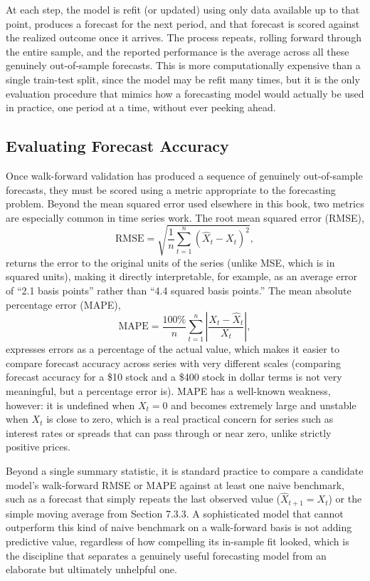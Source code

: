 \documentclass[../ai_in_finance]{subfiles}
\begin{document}
At each step, the model is refit (or updated) using only data available up to that point, produces a forecast for the next period, and that forecast is scored against the realized outcome once it arrives. The process repeats, rolling forward through the entire sample, and the reported performance is the average across all these genuinely out-of-sample forecasts. This is more computationally expensive than a single train-test split, since the model may be refit many times, but it is the only evaluation procedure that mimics how a forecasting model would actually be used in practice, one period at a time, without ever peeking ahead.

\subsection{Evaluating Forecast Accuracy}

Once walk-forward validation has produced a sequence of genuinely out-of-sample forecasts, they must be scored using a metric appropriate to the forecasting problem. Beyond the mean squared error used elsewhere in this book, two metrics are especially common in time series work. The root mean squared error (RMSE),
\begin{equation*}
\text{RMSE} = \sqrt{\frac{1}{n}\sum_{t=1}^n (\hat X_t - X_t)^2},
\end{equation*}
returns the error to the original units of the series (unlike MSE, which is in squared units), making it directly interpretable, for example, as an average error of ``2.1 basis points'' rather than ``4.4 squared basis points.'' The mean absolute percentage error (MAPE),
\begin{equation*}
\text{MAPE} = \frac{100\%}{n}\sum_{t=1}^n \left|\frac{X_t - \hat X_t}{X_t}\right|,
\end{equation*}
expresses errors as a percentage of the actual value, which makes it easier to compare forecast accuracy across series with very different scales (comparing forecast accuracy for a \$10 stock and a \$400 stock in dollar terms is not very meaningful, but a percentage error is). MAPE has a well-known weakness, however: it is undefined when $X_t=0$ and becomes extremely large and unstable when $X_t$ is close to zero, which is a real practical concern for series such as interest rates or spreads that can pass through or near zero, unlike strictly positive prices.

Beyond a single summary statistic, it is standard practice to compare a candidate model's walk-forward RMSE or MAPE against at least one naive benchmark, such as a forecast that simply repeats the last observed value ($\hat X_{t+1} = X_t$) or the simple moving average from Section 7.3.3. A sophisticated model that cannot outperform this kind of naive benchmark on a walk-forward basis is not adding predictive value, regardless of how compelling its in-sample fit looked, which is the discipline that separates a genuinely useful forecasting model from an elaborate but ultimately unhelpful one.
\end{document}
